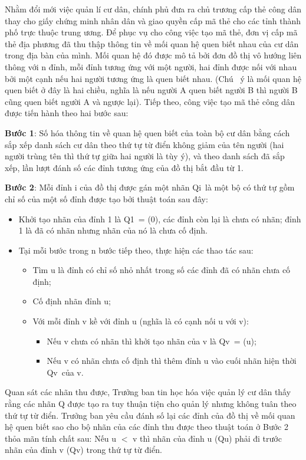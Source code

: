 

Nhằm đổi mới việc quản lí cư dân, chính phủ đưa ra chủ trương cấp thẻ công dân thay cho giấy chứng minh nhân dân và giao quyền cấp mã thẻ cho các tỉnh thành phố trực thuộc trung ương. Để phục vụ cho công việc tạo mã thẻ, đơn vị cấp mã thẻ địa phương đã thu thập thông tin về mối quan hệ quen biết nhau của cư dân trong địa bàn của mình. Mối quan hệ đó được mô tả bởi đơn đồ thị vô hướng liên thông với n đỉnh, mỗi đỉnh tương ứng với một người, hai đỉnh được nối với nhau bởi một cạnh nếu hai người tương ứng là quen biết nhau. (Chú  ý là mối quan hệ quen biết ở đây là hai chiều, nghĩa là nếu người A quen biết người B thì người B cũng quen biết người A và ngược lại). Tiếp theo, công việc tạo mã thẻ công dân được tiến hành theo hai bước sau:

\textbf{Bước 1}: Số hóa thông tin về quan hệ quen biết của toàn bộ cư dân bằng cách sắp xếp danh sách cư dân theo thứ tự từ điển không giảm của tên người (hai người trùng tên thì thứ tự giữa hai người là tùy ý), và theo danh sách đã sắp xếp, lần lượt đánh số các đỉnh tương ứng của đồ thị bắt đầu từ 1.

\textbf{Bước 2}: Mỗi đỉnh i của đồ thị được gán một nhãn Qi là một bộ có thứ tự gồm chỉ số của một số đỉnh được tạo bởi thuật toán sau đây:
\begin{itemize}
	\item Khởi tạo nhãn của đỉnh 1 là Q1 = (0), các đỉnh còn lại là chưa có nhãn; đỉnh 1 là đã có nhãn nhưng nhãn của nó là chưa cố định.
	\item Tại mỗi bước trong n bước tiếp theo, thực hiện các thao tác sau:
\begin{itemize}
	\item Tìm u là đỉnh có chỉ số nhỏ nhất trong số các đỉnh đã có nhãn chưa cố định;
	\item Cố định nhãn đỉnh u;
	\item Với mỗi đỉnh v kề với đỉnh u (nghĩa là có cạnh nối u với v):
\begin{itemize}
	\item Nếu v chưa có nhãn thì khởi tạo nhãn của v là Qv = (u);
	\item Nếu v có nhãn chưa cố định thì thêm đỉnh u vào cuối nhãn hiện thời Qv của v.
\end{itemize}
\end{itemize}
\end{itemize}

Quan sát các nhãn thu được, Trưởng ban tin học hóa việc quản lý cư dân thấy rằng các nhãn Q được tạo ra tuy thuận tiện cho quản lý nhưng không tuân theo thứ tự từ điển. Trưởng ban yêu cầu đánh số lại các đỉnh của đồ thị về mối quan hệ quen biết sao cho bộ nhãn của các đỉnh thu được theo thuật toán ở Bước 2 thỏa mãn tính chất sau: Nếu u $<$ v thì nhãn của đỉnh u (Qu) phải đi trước nhãn của đỉnh v (Qv) trong thứ tự từ điển.

